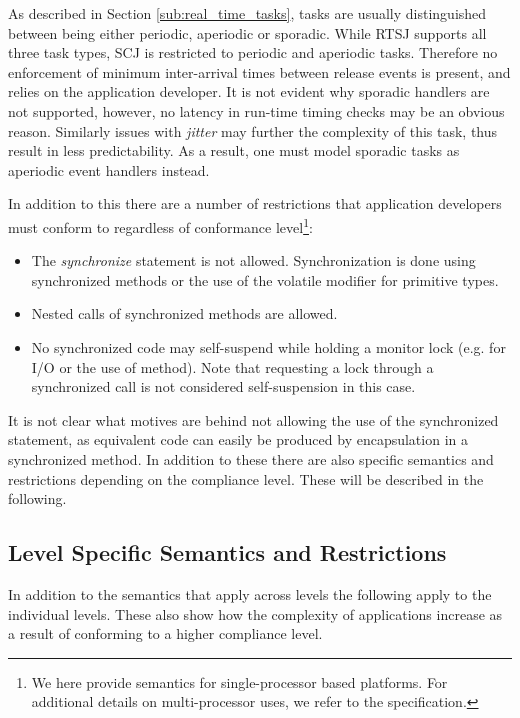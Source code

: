 As described in Section \ref{sub:real_time_tasks}, tasks are usually distinguished between being either periodic, aperiodic or sporadic. While RTSJ supports all three task types, SCJ is restricted to periodic and aperiodic tasks. Therefore no enforcement of minimum inter-arrival times between release events is present, and relies on the application developer. It is not evident why sporadic handlers are not supported, however, no latency in run-time timing checks may be an obvious reason. Similarly issues with \textit{jitter} may further the complexity of this task, thus result in less predictability. As a result, one must model sporadic tasks as aperiodic event handlers instead.

In addition to this there are a number of restrictions that application developers must conform to regardless of conformance level\footnote{We here provide semantics for single-processor based platforms. For additional details on multi-processor uses, we refer to the specification.}:
\begin{itemize}
	\item The \textit{synchronize} statement is not allowed. Synchronization is done using synchronized methods or the use of the volatile modifier for primitive types.
	\item Nested calls of synchronized methods are allowed.
	\item No synchronized code may self-suspend while holding a monitor lock (e.g. for I/O or the use of  method). Note that requesting a lock through a synchronized call is not considered self-suspension in this case.
\end{itemize}

It is not clear what motives are behind not allowing the use of the synchronized statement, as equivalent code can easily be produced by encapsulation in a synchronized method.
In addition to these there are also specific semantics and restrictions depending on the compliance level. These will be described in the following.


\subsection{Level Specific Semantics and Restrictions} %
\label{sub:level_specific_restrictions}
In addition to the semantics that apply across levels the following apply to the individual levels. These also show how the complexity of applications increase as a result of conforming to a higher compliance level.

